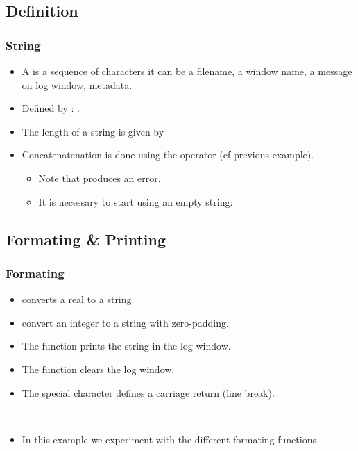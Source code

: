 \subsection{Definition}
\begin{frame}[fragile]
  \frametitle<presentation>{String}
  \begin{itemize}
  \item A  is a sequence of characters it can be a
    filename, a window name, a message on log window, metadata.
  \item Defined by : .
  \item The length of a string is given by 
  \item Concatenatenation is done using the operator \code{+} (cf previous example).
    \begin{itemize}
    \item Note that  produces an error.
    \item It is necessary to start using an empty string: 
    \end{itemize}
  \end{itemize}
\end{frame}

\subsection{Formating \& Printing}
\begin{frame}[fragile]
  \frametitle<presentation>{Formating}
  \begin{itemize}
  \item {} converts a real to a string.
  \item {} convert an integer to a string with zero-padding.
  \item The function  prints the string in the log window.
  \item The function  clears the log window.
  \item The special character  defines a carriage return (line break).
  \end{itemize}
\end{frame}

\begin{frame}[fragile]
  \begin{example}~\par
    \begin{itemize}
    \item In this example we experiment with the different formating
      functions.~\par
      
    \end{itemize}
  \end{example}
\end{frame}

